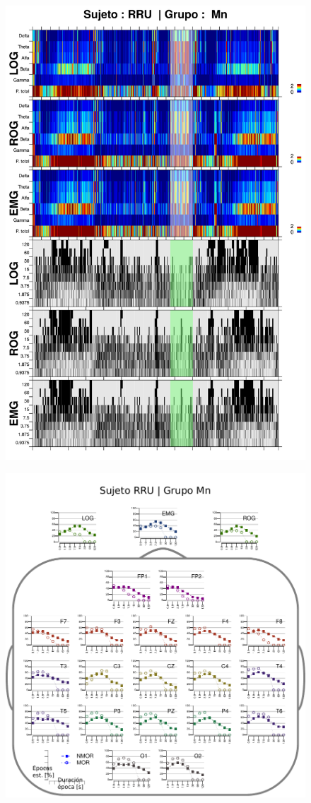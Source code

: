 \begin{figure}
\centering
\includegraphics[width=0.9\linewidth]
{./img_resultados/RRMNS_combinado_.png} 
\end{figure}

\begin{figure}
\centering
\includegraphics[width=.9\linewidth]{./img_resultados/cabeza_RRU.pdf}
\end{figure}

